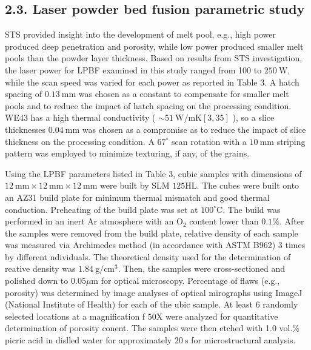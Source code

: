 \documentclass[10pt]{article}
\begin{document}
\subsection*{2.3. Laser powder bed fusion parametric study}
STS provided insight into the development of melt pool, e.g., high power produced deep penetration and porosity, while low power produced smaller melt pools than the powder layer thickness. Based on results from STS investigation, the laser power for LPBF examined in this study ranged from 100 to $250 \mathrm{~W}$, while the scan speed was varied for each power as reported in Table 3. A hatch spacing of $0.13 \mathrm{~mm}$ was chosen as a constant to compensate for smaller melt pools and to reduce the impact of hatch spacing on the processing condition. WE43 has a high thermal conductivity ( $\sim 51 \mathrm{~W} / \mathrm{mK}[3,35]$ ), so a slice thicknesses $0.04 \mathrm{~mm}$ was chosen as a compromise as to reduce the impact of slice thickness on the processing condition. A $67^{\circ}$ scan rotation with a $10 \mathrm{~mm}$ striping pattern was employed to minimize texturing, if any, of the grains.

Using the LPBF parameters listed in Table 3, cubic samples with dimensions of $12 \mathrm{~mm} \times 12 \mathrm{~mm} \times 12 \mathrm{~mm}$ were built by SLM $125 \mathrm{HL}$. The cubes were built onto an AZ31 build plate for minimum thermal mismatch and good thermal conduction. Preheating of the build plate was set at $100^{\circ} \mathrm{C}$. The build was performed in an inert Ar atmosphere with an $\mathrm{O}_{2}$ content lower than $0.1 \%$. After the samples were removed from the build plate, relative density of each sample was measured via Archimedes method (in accordance with ASTM B962) 3 times by different ndividuals. The theoretical density used for the determination of reative density was $1.84 \mathrm{~g} / \mathrm{cm}^{3}$. Then, the samples were cross-sectioned and polished down to $0.05 \mu \mathrm{m}$ for optical microscopy. Percentage of flaws (e.g., porosity) was determined by image analyses of optical mirographs using ImageJ (National Institute of Health) for each of the ubic sample. At least 6 randomly selected locations at a magnification f $50 \mathrm{X}$ were analyzed for quantitative determination of porosity conent. The samples were then etched with 1.0 vol.\% picric acid in dislled water for approximately $20 \mathrm{~s}$ for microstructural analysis.
\end{document}
